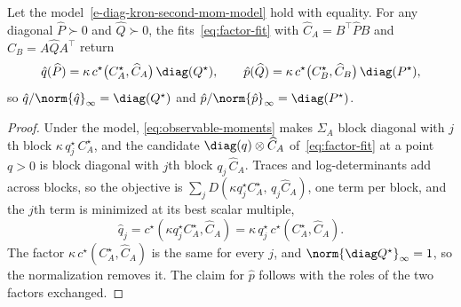 \begin{lemma}[Consistency]\label{lem:consistency}
Let the model~\eqref{e-diag-kron-second-mom-model} hold with equality. For any
diagonal $\widehat P\succ0$ and $\widehat Q\succ0$, the
fits~\eqref{eq:factor-fit}  with $\widehat C_A=B^\top\widehat PB$
and $\widehat C_B=A\widehat QA^\top$ return
\[
  \hat{q}(\widehat P)=\kappa\,c^\star\big(C^\star_A,\widehat C_A\big)\,\diag(Q^\star),
  \qquad
  \hat{p}(\widehat Q)=\kappa\,c^\star\big(C^\star_B,\widehat C_B\big)\,\diag(P^\star),
\]
so $\hat{q}/\norm{\hat{q}}_\infty=\diag(Q^\star)$ and
$\hat{p}/\norm{\hat{p}}_\infty=\diag(P^\star)$.
\end{lemma}
\begin{proof}
Under the model, \eqref{eq:observable-moments} makes $\Sigma_A$ block
diagonal with $j$th block $\kappa\,q^\star_j\,C^\star_A$, and the candidate
$\diag(q)\otimes\widehat C_A$ of~\eqref{eq:factor-fit} at a point $q>0$
is block diagonal with $j$th block $q_j\,\widehat C_A$. Traces and
log-determinants add across blocks, so the objective is
$\sum_jD(\kappa q^\star_jC^\star_A,\,q_j\widehat C_A)$, one term per
block, and the $j$th term is minimized at its best scalar
multiple,
\[
\hat{q}_j=c^\star(\kappa q^\star_jC^\star_A,\widehat C_A)
=\kappa\,q^\star_j\,c^\star(C^\star_A,\widehat C_A).
\]
The factor
$\kappa\,c^\star(C^\star_A,\widehat C_A)$ is the same for every $j$, and
$\norm{\diag Q^\star}_\infty=1$, so the normalization removes it. The claim
for $\hat{p}$ follows with the roles of the two factors exchanged.
\end{proof}

